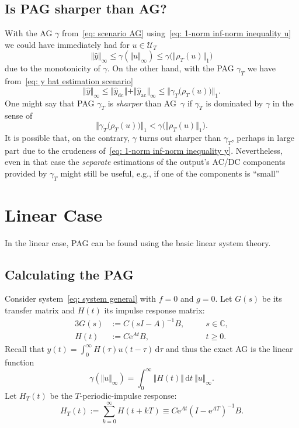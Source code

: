 \documentclass[letterpaper, 10 pt, conference]{ieeeconf}
\newcommand{\ac}{_\mathrm{ac}}
\newcommand{\dc}{_\mathrm{dc}}
\newcommand{\dif}{\mathrm{d}}
\newcommand{\ee}{\mathrm{e}}
\newcommand{\pb}[1]{\big( #1 \big)}
\newcommand{\norm}[1]{\Vert #1 \Vert}
\newcommand{\normb}[1]{\big\Vert #1 \big\Vert}
\newcommand{\bbC}{\mathbb{C}}
\newcommand{\calU}{\mathcal{U}}
\begin{document}
\subsection{Is PAG sharper than AG?}
\label{se: sharpness}

With the AG $\gamma$ from~\eqref{eq: scenario AG} using~\eqref{eq: 1-norm inf-norm inequality u} we could have immediately had for $u \in \calU_T$
\begin{equation}
    \norm{\hat y}_\infty \leq \gamma(\norm{u}_\infty) \leq \gamma\pb{\norm{\rho_T(u)}_1}
\end{equation}
due to the monotonicity of $\gamma$. On the other hand, with the PAG $\gamma_T$ we have from~\eqref{eq: y hat estimation scenario}
\begin{equation}
    \label{eq: 1-norm inf-norm inequality y}
    \norm{\hat y}_\infty \leq \norm{\hat y\dc} + \norm{\hat y\ac}_\infty
    \leq \normb{\gamma_T\pb{\rho_T(u)}}_1.
\end{equation}
One might say that PAG $\gamma_T$ is \emph{sharper} than AG~$\gamma$ if $\gamma_T$ is dominated by $\gamma$ in the sense of
\begin{equation}
    \label{eq: scenario PAG better than AG}
    \normb{\gamma_T\pb{\rho_T(u)}}_1 <
    \gamma\pb{\norm{\rho_T(u)}_1}.
\end{equation}
It is possible that, on the contrary, $\gamma$ turns out sharper than $\gamma_T$, perhaps in large part due to the crudeness of~\eqref{eq: 1-norm inf-norm inequality y}. Nevertheless, even in that case the \emph{separate} estimations of the output's AC/DC components provided by $\gamma_T$ might still be useful, e.g., if one of the components is ``small''

\section{Linear Case}
\label{se: linear}

In the linear case, PAG can be found using the basic linear system theory.

\subsection{Calculating the PAG}

Consider system~\eqref{eq: system general} with $f = 0$ and $g = 0$. Let $G(s)$ be its transfer matrix and $H(t)$ its impulse response matrix:
\begin{alignat}{3}
    G(s) &:= C (sI - A)^{-1} B, \quad && s\in\bbC, \\
    H(t) &:= C \ee^{At} B, && t\geq 0.
\end{alignat}
Recall that $y(t) = \int_0^\infty H(\tau) u(t-\tau) \,\dif\tau$ and thus the exact AG is the linear function
\begin{equation}
    \label{eq: exact AG linear}
    \gamma(\norm{u}_\infty) = \int_0^\infty \norm{H(t)} \,\dif t \: \norm{u}_\infty.
\end{equation}
Let $H_T(t)$ be the $T$-periodic-impulse response:
\begin{equation}
    H_T(t) := \sum_{k=0}^{\infty} H(t + kT)
    \equiv C \ee^{At} (I - \ee^{AT})^{-1} B.
\end{equation}
\end{document}
